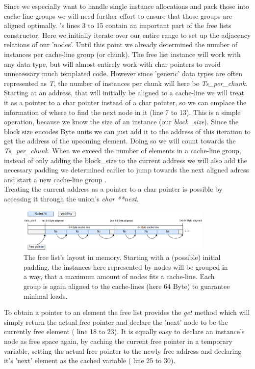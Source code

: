 Since we especially want to handle single instance allocations and pack those into cache-line groups we will need further effort to ensure that those groups are aligned optimally. 's lines 3 to 15 contain an important part of the free lists constructor. Here we initially iterate over our entire range to set up the adjacency relations of our 'nodes'. Until this point we already determined the number of instances per cache-line group (or chunk). The free list instance will work with any data type, but will almost entirely work with char pointers to avoid unnecessary much templated code. However since 'generic' data types are often represented as \textit{T}, the number of instances per chunk will here be \textit{Ts\_per\_chunk}.\\
Starting at an address, that will initially be aligned to a cache-line we will treat it as a pointer to a char pointer instead of a char pointer, so we can emplace the information of where to find the next node in it (line 7 to 13). This is a simple operation, because we know the size of an instance (our \textit{block\_size}). Since the block size encodes Byte units we can just add it to the address of this iteration to get the address of the upcoming element. Doing so we will count towards the \textit{Ts\_per\_chunk}. When we exceed the number of elements in a cache-line group, instead of only adding the block\_size to the current address we will also add the necessary padding we determined earlier to jump towards the next aligned adress and start a new cache-line group .\\
Treating the current address as a pointer to a char pointer is possible by accessing it through the union's \textit{char **next}. 
\begin{figure}[!htbp]
	\centering
	\includegraphics[width=0.86\textwidth, height=0.3\textwidth]{PICs/free_list_in_memory}
	\caption{The free list's layout in memory. Starting with a (possible) initial padding, the instances here represented by nodes will be grouped in a way, that a maximum amount of nodes fits a cache-line. Each group is again aligned to the cache-lines (here 64 Byte) to guarantee minimal loads.}
	\label{free_list_in_memory}
\end{figure}
To obtain a pointer to an element the free list provides the \textit{get} method which will simply return the actual free pointer and declare the 'next' node to be the currently free element ( line 18 to 23). It is equally easy to declare an instance's node as free space again, by caching the current free pointer in a temporary variable, setting the actual free pointer to the newly free address and declaring it's 'next' element as the cached variable ( line 25 to 30).

